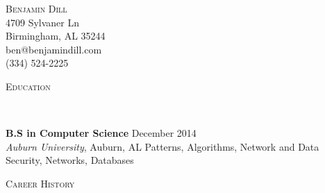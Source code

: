 \documentclass[9pt]{article}
\newenvironment{changemargin}[2]{%
  \begin{list}{}{%
      \setlength{\topsep}{0pt}%
      \setlength{\leftmargin}{#1}%
      \setlength{\rightmargin}{#2}%
      \setlength{\listparindent}{\parindent}%
      \setlength{\itemindent}{\parindent}%
      \setlength{\parsep}{\parskip}%
    }%
  \item[]}{\end{list}
}
\newcommand{\lineover}{
  \begin{changemargin}{-0.05in}{-0.05in}
    \vspace*{-8pt}
    \hrulefill \\
    \vspace*{-2pt}
  \end{changemargin}
}
\newcommand{\header}[1]{
  \begin{changemargin}{-0.5in}{-0.5in}
    \scshape{#1}\\
    \lineover
  \end{changemargin}
}
\newcommand{\contact}[5]{
  \begin{changemargin}{-0.5in}{-0.5in}
    \begin{center}
      {\Large \scshape {#1}}\\ \smallskip
      {#2}\\ \smallskip 
      {#3}\\ \smallskip
      {#4}\\ \smallskip
      {#5}\smallskip
    \end{center}
  \end{changemargin}
}
\newenvironment{body} {
  \vspace*{-16pt}
  \begin{changemargin}{-0.25in}{-0.5in}
  }	
  {\end{changemargin}
}
\begin{document}
\contact{Benjamin Dill}{4709 Sylvaner Ln}{Birmingham, AL 35244}{ben@benjamindill.com}{(334) 524-2225}


% 
% 


\header{Education}

\begin{body}
  \vspace{17pt}
  \textbf{B.S in Computer Science}{} \hfill December 2014{} \\
  \emph{Auburn University}, Auburn, AL{} %
  \hspace{4ex} Patterns, Algorithms, Network and Data Security, Networks, Databases
\end{body}

\smallskip


\header{Career History}
\end{document}
